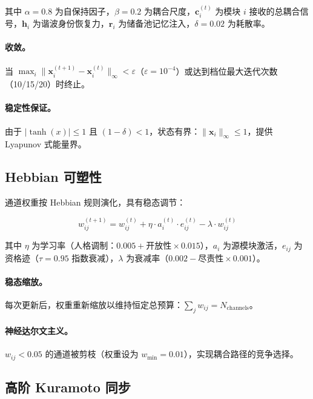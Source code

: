\documentclass[UTF8,11pt]{ctexart}
\begin{document}
其中 $\alpha = 0.8$ 为自保持因子，$\beta = 0.2$ 为耦合尺度，$\mathbf{c}_i^{(t)}$ 为模块 $i$ 接收的总耦合信号，$\mathbf{h}_i$ 为谐波身份恢复力，$\mathbf{r}_i$ 为储备池记忆注入，$\delta = 0.02$ 为耗散率。

\paragraph{收敛。}当 $\max_i \|\mathbf{x}_i^{(t+1)} - \mathbf{x}_i^{(t)}\|_\infty < \varepsilon$（$\varepsilon = 10^{-4}$）或达到档位最大迭代次数（10/15/20）时终止。

\paragraph{稳定性保证。}由于 $|\tanh(x)| \leq 1$ 且 $(1-\delta) < 1$，状态有界：$\|\mathbf{x}_i\|_\infty \leq 1$，提供 Lyapunov 式能量界。

\subsection{Hebbian 可塑性}
\label{sec:plasticity}

通道权重按 Hebbian 规则演化，具有稳态调节：

\begin{equation}
w_{ij}^{(t+1)} = w_{ij}^{(t)} + \eta \cdot a_i^{(t)} \cdot e_{ij}^{(t)} - \lambda \cdot w_{ij}^{(t)}
\end{equation}

其中 $\eta$ 为学习率（人格调制：$0.005 + \text{开放性} \times 0.015$），$a_i$ 为源模块激活，$e_{ij}$ 为资格迹（$\tau = 0.95$ 指数衰减），$\lambda$ 为衰减率（$0.002 - \text{尽责性} \times 0.001$）。

\paragraph{稳态缩放。}每次更新后，权重重新缩放以维持恒定总预算：$\sum_j w_{ij} = N_{\text{channels}}$。

\paragraph{神经达尔文主义。}$w_{ij} < 0.05$ 的通道被剪枝（权重设为 $w_{\min} = 0.01$），实现耦合路径的竞争选择。

\subsection{高阶 Kuramoto 同步}
\label{sec:kuramoto}
\end{document}
